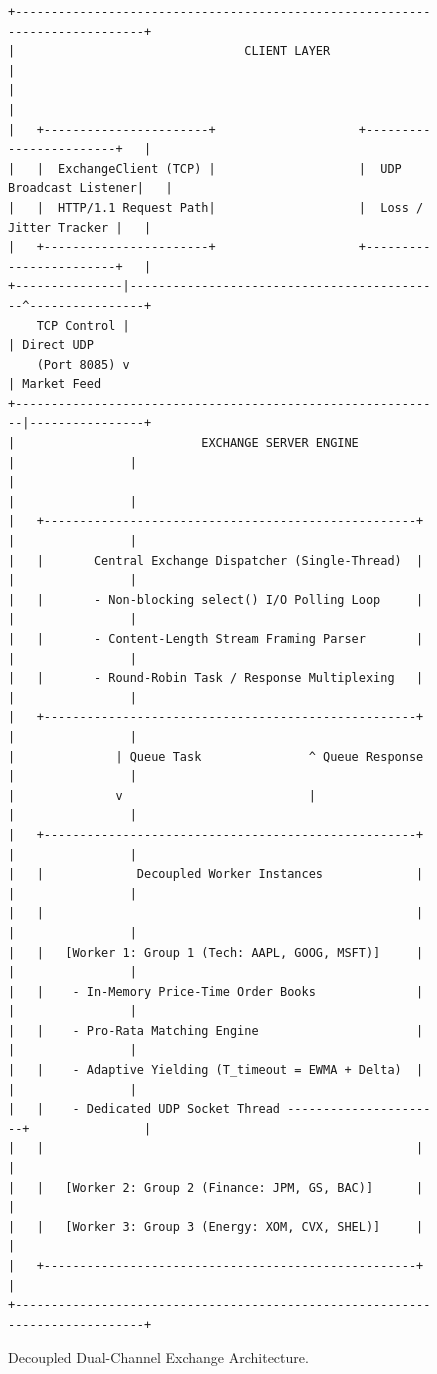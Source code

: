 \documentclass[11pt,a4paper]{article}
\begin{document}
\begin{figure}[h!]
\centering
\begin{verbatim}
+-----------------------------------------------------------------------------+
|                                CLIENT LAYER                                 |
|                                                                             |
|   +-----------------------+                    +------------------------+   |
|   |  ExchangeClient (TCP) |                    |  UDP Broadcast Listener|   |
|   |  HTTP/1.1 Request Path|                    |  Loss / Jitter Tracker |   |
|   +-----------------------+                    +------------------------+   |
+---------------|--------------------------------------------^----------------+
    TCP Control |                                            | Direct UDP
    (Port 8085) v                                            | Market Feed
+------------------------------------------------------------|----------------+
|                          EXCHANGE SERVER ENGINE            |                |
|                                                            |                |
|   +----------------------------------------------------+   |                |
|   |       Central Exchange Dispatcher (Single-Thread)  |   |                |
|   |       - Non-blocking select() I/O Polling Loop     |   |                |
|   |       - Content-Length Stream Framing Parser       |   |                |
|   |       - Round-Robin Task / Response Multiplexing   |   |                |
|   +----------------------------------------------------+   |                |
|              | Queue Task               ^ Queue Response   |                |
|              v                          |                  |                |
|   +----------------------------------------------------+   |                |
|   |             Decoupled Worker Instances             |   |                |
|   |                                                    |   |                |
|   |   [Worker 1: Group 1 (Tech: AAPL, GOOG, MSFT)]     |   |                |
|   |    - In-Memory Price-Time Order Books              |   |                |
|   |    - Pro-Rata Matching Engine                      |   |                |
|   |    - Adaptive Yielding (T_timeout = EWMA + Delta)  |   |                |
|   |    - Dedicated UDP Socket Thread ----------------------+                |
|   |                                                    |                    |
|   |   [Worker 2: Group 2 (Finance: JPM, GS, BAC)]      |                    |
|   |   [Worker 3: Group 3 (Energy: XOM, CVX, SHEL)]     |                    |
|   +----------------------------------------------------+                    |
+-----------------------------------------------------------------------------+
\end{verbatim}
\caption{Decoupled Dual-Channel Exchange Architecture.}
\label{fig:arch}
\end{figure}
\end{document}
